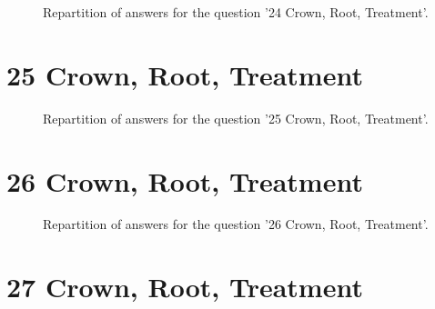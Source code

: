 \documentclass[12pt]{article}
\begin{document}
\label{sec:36}


\begin{figure}[h!]
    \caption{\label{figure:q36-1}Repartition of answers for the question '24
Crown, Root, Treatment'.}
\end{figure}



\clearpage{}
\section{25
Crown, Root, Treatment}

\label{sec:37}


\begin{figure}[h!]
    \caption{\label{figure:q37-1}Repartition of answers for the question '25
Crown, Root, Treatment'.}
\end{figure}



\clearpage{}
\section{26
Crown, Root, Treatment}

\label{sec:38}


\begin{figure}[h!]
    \caption{\label{figure:q38-1}Repartition of answers for the question '26
Crown, Root, Treatment'.}
\end{figure}



\clearpage{}
\section{27
Crown, Root, Treatment}

\label{sec:39}
\end{document}

